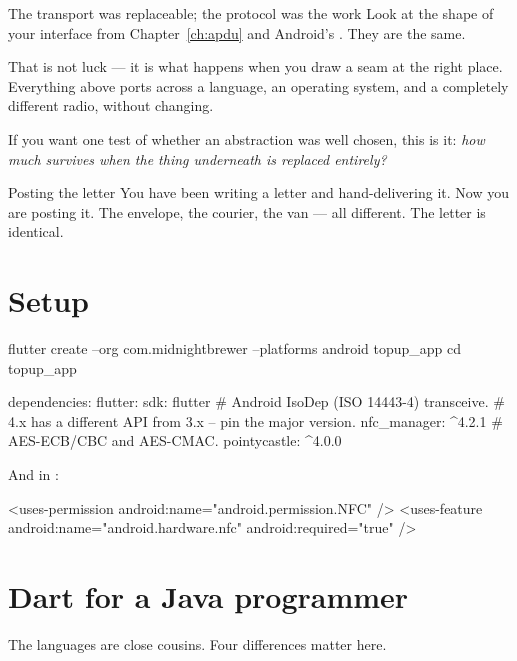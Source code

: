 \begin{concept}{The transport was replaceable; the protocol was the work}
Look at the shape of your  interface from
Chapter~\ref{ch:apdu} and Android's . They are the same.

That is not luck --- it is what happens when you draw a seam at the right place.
Everything above  ports across a language, an operating system,
and a completely different radio, without changing.

If you want one test of whether an abstraction was well chosen, this is it:
\emph{how much survives when the thing underneath is replaced entirely?}
\end{concept}

\begin{analogy}{Posting the letter}
You have been writing a letter and hand-delivering it. Now you are posting it.
The envelope, the courier, the van --- all different. The letter is identical.
\end{analogy}

\section{Setup}

\begin{shell}
flutter create --org com.midnightbrewer --platforms android topup_app
cd topup_app
\end{shell}

\begin{xcode}
dependencies:
  flutter:
    sdk: flutter
  # Android IsoDep (ISO 14443-4) transceive.
  # 4.x has a different API from 3.x -- pin the major version.
  nfc_manager: ^4.2.1
  # AES-ECB/CBC and AES-CMAC.
  pointycastle: ^4.0.0
\end{xcode}

And in :

\begin{xcode}
<uses-permission android:name="android.permission.NFC" />
<uses-feature android:name="android.hardware.nfc" android:required="true" />
\end{xcode}

\section{Dart for a Java programmer}

The languages are close cousins. Four differences matter here.

